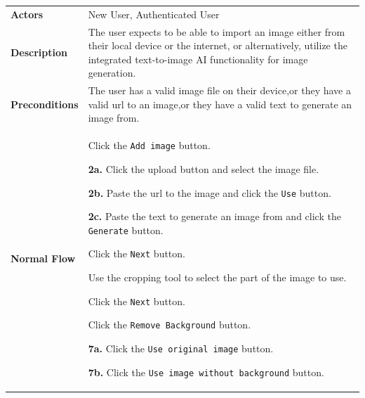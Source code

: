 \begin{longtable}{@{}>{\raggedright\arraybackslash}p{3cm} p{11cm}}
    \textbf{Actors}         & New User, Authenticated User
    \\

    \textbf{Description}    & The user expects to be able to import an image either from their local device or the internet, or alternatively, utilize the integrated text-to-image AI functionality for image generation.
    \\

    \textbf{Preconditions}  & The user has a valid image file on their device,\newline or they have a valid \acrshort{url} to an image,\newline or they have a valid text to generate an image from.
    \\

    \textbf{Normal Flow}    & \begin{usecaseenum}
                                  \item Click the \texttt{Add image} button.
                                  \item[\textcolor{enumgray}{\bfseries{2a.}}] Click the upload button and select the image file.
                                  \item[\textcolor{enumgray}{\bfseries{2b.}}] Paste the \acrshort{url} to the image and click the \texttt{Use} button.
                                  \item[\textcolor{enumgray}{\bfseries{2c.}}] Paste the text to generate an image from and click the \texttt{Generate} button.\setcounter{enumi}{2}
                                  \item Click the \texttt{Next} button.
                                  \item Use the cropping tool to select the part of the image to use.
                                  \item Click the \texttt{Next} button.
                                  \item Click the \texttt{Remove Background} button.
                                  \item[\textcolor{enumgray}{\bfseries{7a.}}] Click the \texttt{Use original image} button.
                                  \item[\textcolor{enumgray}{\bfseries{7b.}}] Click the \texttt{Use image without background} button.
                              \end{usecaseenum}
    \\


\end{longtable}
